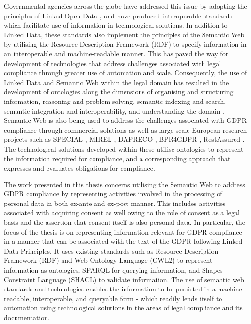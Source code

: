 Governmental agencies across the globe have addressed this issue by adopting the principles of Linked Open Data \cite{bizer_linked_2011}, and have produced interoperable standards \cite{palmirani_akoma_2018,european_union_eli_2015,van_opijnen_european_2011} which facilitate use of information in technological solutions.
In addition to Linked Data, these standards also implement the principles of the Semantic Web \cite{noauthor_semantic_nodate} by utilising the Resource Description Framework (RDF) \cite{noauthor_rdf_2014} to specify information in an interoperable and machine-readable manner.
This has paved the way for development of technologies that address challenges associated with legal compliance through greater use of automation and scale.
Consequently, the use of Linked Data and Semantic Web within the legal domain has resulted in the development of ontologies along the dimensions of organising and structuring information, reasoning and problem solving, semantic indexing and search, semantic integration and interoperability, and understanding the domain \cite{rodrigues_legal_2019}.
Semantic Web is also being used to address the challenges associated with GDPR compliance through commercial solutions as well as large-scale European research projects such as SPECIAL \cite{noauthor_scalable_nodate}, MIREL \cite{noauthor_mirel_nodate}, DAPRECO \cite{noauthor_data_2018-1}, BPR4GDPR \cite{noauthor_bpr4gdpr_nodate}, RestAssured \cite{noauthor_restassured_nodate}.
The technological solutions developed within these utilise ontologies to represent the information required for compliance, and a corresponding approach that expresses and evaluates obligations for compliance.

The work presented in this thesis concerns utilising the Semantic Web to address GDPR compliance by representing activities involved in the processing of personal data in both ex-ante and ex-post manner.
This includes activities associated with acquiring consent as well owing to the role of consent as a legal basis and the assertion that consent itself is also personal data.
In particular, the focus of the thesis is on representing information relevant for GDPR compliance in a manner that can be associated with the text of the GDPR following Linked Data Principles.
It uses existing standards such as Resource Description Framework (RDF) \cite{noauthor_rdf_2014} and Web Ontology Language (OWL2) \cite{noauthor_owl_2012} to represent information as ontologies, SPARQL \cite{noauthor_sparql_nodate} for querying information, and Shapes Constraint Language (SHACL) \cite{knublauch_shapes_2017} to validate information.
The use of semantic web standards and technologies enables the information to be persisted in a machine-readable, interoperable, and queryable form - which readily lends itself to automation using technological solutions in the areas of legal compliance and its documentation.

